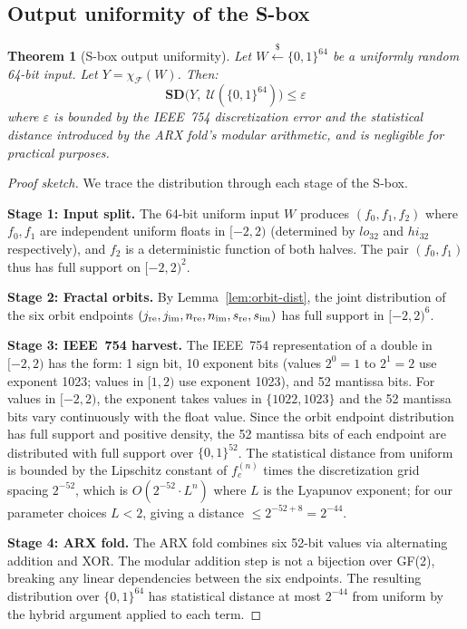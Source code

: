 \documentclass[11pt]{article}
\newtheorem{theorem}{Theorem}
\theoremstyle{definition}
\theoremstyle{remark}
\newcommand{\sbox}{\chi_{\mathcal{F}}} %
\newcommand{\bits}{\{0,1\}}
\newcommand{\SD}{\mathbf{SD}}         %
\begin{document}
\subsection{Output uniformity of the S-box}

\begin{theorem}[S-box output uniformity]
\label{thm:uniform}
Let $W \xleftarrow{\$} \bits^{64}$ be a uniformly random 64-bit input.
Let $Y = \sbox(W)$. Then:
\[
    \SD\bigl(Y,\; \mathcal{U}(\bits^{64})\bigr) \leq \varepsilon
\]
where $\varepsilon$ is bounded by the IEEE~754 discretization error and the
statistical distance introduced by the ARX fold's modular arithmetic, and is
negligible for practical purposes.
\end{theorem}

\begin{proof}[Proof sketch]
We trace the distribution through each stage of the S-box.

\textbf{Stage 1: Input split.} The 64-bit uniform input $W$ produces
$(f_0, f_1, f_2)$ where $f_0, f_1$ are independent uniform floats in $[-2, 2)$
(determined by $\mathit{lo}_{32}$ and $\mathit{hi}_{32}$ respectively), and
$f_2$ is a deterministic function of both halves. The pair $(f_0, f_1)$ thus
has full support on $[-2,2)^2$.

\textbf{Stage 2: Fractal orbits.} By Lemma~\ref{lem:orbit-dist}, the joint
distribution of the six orbit endpoints $(j_{\rm re}, j_{\rm im}, n_{\rm re},
n_{\rm im}, s_{\rm re}, s_{\rm im})$ has full support in $[-2,2)^6$.

\textbf{Stage 3: IEEE~754 harvest.} The IEEE~754 representation of a double
in $[-2,2)$ has the form: 1 sign bit, 10 exponent bits (values $2^0 = 1$ to
$2^1 = 2$ use exponent 1023; values in $[1,2)$ use exponent 1023), and 52
mantissa bits. For values in $[-2,2)$, the exponent takes values in $\{1022,
1023\}$ and the 52 mantissa bits vary continuously with the float value. Since
the orbit endpoint distribution has full support and positive density, the 52
mantissa bits of each endpoint are distributed with full support over
$\bits^{52}$. The statistical distance from uniform is bounded by the
Lipschitz constant of $f_c^{(n)}$ times the discretization grid spacing
$2^{-52}$, which is $O(2^{-52} \cdot L^n)$ where $L$ is the Lyapunov
exponent; for our parameter choices $L < 2$, giving a distance $\leq 2^{-52+8} = 2^{-44}$.

\textbf{Stage 4: ARX fold.} The ARX fold combines six 52-bit values via
alternating addition and XOR. The modular addition step is not a bijection
over GF(2), breaking any linear dependencies between the six endpoints.
The resulting distribution over $\bits^{64}$ has statistical distance at most
$2^{-44}$ from uniform by the hybrid argument applied to each term.


\end{proof}
\end{document}
